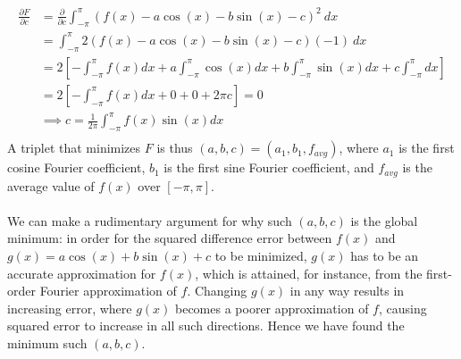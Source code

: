 \documentclass[12pt]{article}
\begin{document}
{\begin{align*}
\frac{\partial F}{\partial c} &= \frac{\partial}{\partial c} \int_{-\pi}^\pi \left ( f(x) - a\cos(x) - b\sin(x) - c \right )^2 \ dx \\
&= \int_{-\pi}^\pi  2( f(x) - a\cos(x) - b\sin(x) - c)(-1) \ dx \\
&= 2 \left[-\int_{-\pi}^\pi  f(x) dx + a \int_{-\pi}^\pi \cos(x) dx + b \int_{-\pi}^\pi  \sin(x) dx + c \int_{-\pi}^\pi dx \right] \\
&= 2 \left[-\int_{-\pi}^\pi  f(x) dx + 0 + 0 + 2\pi c \right] = 0 \\
&\implies c = \frac{1}{2\pi} \int_{-\pi}^\pi  f(x)\sin(x) dx  \\
\end{align*}
A triplet that minimizes $F$ is thus $(a,b,c) = (a_1, b_1, f_{avg})$, where $a_1$ is the first cosine Fourier coefficient, $b_1$ is the first sine Fourier coefficient, and $f_{avg}$ is the average value of $f(x)$ over $[-\pi, \pi]$. \\ \\ We can make a rudimentary argument for why such $(a,b,c)$ is the global minimum: in order for the squared difference error between $f(x)$ and $g(x) = a \cos(x) + b\sin(x) + c$ to be minimized, $g(x)$ has to be an accurate approximation for $f(x)$, which is attained, for instance, from the first-order Fourier approximation of $f$. Changing $g(x)$ in any way results in increasing error, where $g(x)$ becomes a poorer approximation of $f$, causing squared error to increase in all such directions. Hence we have found the minimum such $(a,b,c)$.
}
\end{document}
